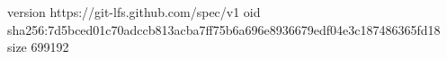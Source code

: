 version https://git-lfs.github.com/spec/v1
oid sha256:7d5bced01c70adccb813acba7ff75b6a696e8936679edf04e3c187486365fd18
size 699192

